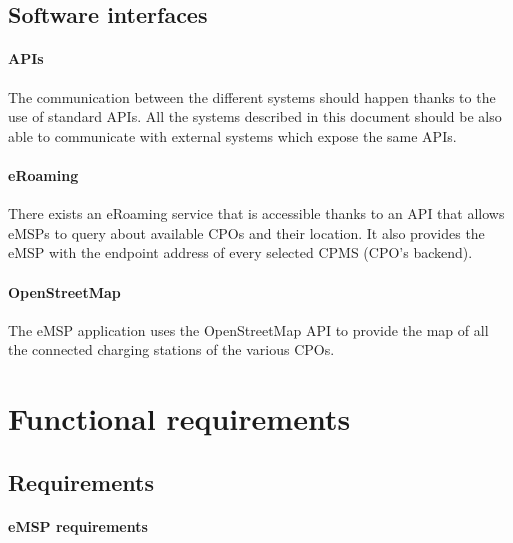 \subsection{Software interfaces}

\paragraph{APIs} The communication between the different systems should happen thanks to the use of standard APIs. All the systems described in this document should be also able to communicate with external systems which expose the same APIs.

\paragraph{eRoaming} There exists an eRoaming service that is accessible thanks to an API that allows eMSPs to query about available CPOs and their location. It also provides the eMSP with the endpoint address of every selected CPMS (CPO's backend).

\paragraph{OpenStreetMap} The eMSP application uses the OpenStreetMap API to provide the map of all the connected charging stations of the various CPOs.

\section{Functional requirements}

\subsection{Requirements}

\paragraph{eMSP requirements}

